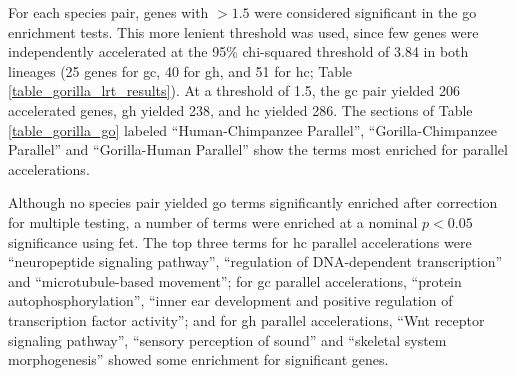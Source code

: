 For each species pair, genes with \lrtmin$>1.5$ were considered
significant in the \ac{go} enrichment tests. This more lenient
threshold was used, since few genes were independently accelerated at
the 95\% chi-squared threshold of 3.84 in both lineages (25 genes for
\ac{gc}, 40 for \ac{gh}, and 51 for \ac{hc}; Table
\ref{table_gorilla_lrt_results}). At a \lrtmin threshold of 1.5, the
\ac{gc} pair yielded 206 accelerated genes, \ac{gh} yielded 238, and
\ac{hc} yielded 286. The sections of Table \ref{table_gorilla_go}
labeled ``Human-Chimpanzee Parallel'', ``Gorilla-Chimpanzee Parallel''
and ``Gorilla-Human Parallel'' show the terms most enriched for
parallel accelerations.

Although no species pair yielded \ac{go} terms significantly enriched
after correction for multiple testing, a number of terms were enriched
at a nominal $p<0.05$ significance using \ac{fet}. The top three terms
for \ac{hc} parallel accelerations were ``neuropeptide signaling
pathway'', ``regulation of DNA-dependent transcription'' and
``microtubule-based movement''; for \ac{gc} parallel accelerations,
``protein autophosphorylation'', ``inner ear development and positive
regulation of transcription factor activity''; and for \ac{gh}
parallel accelerations, ``Wnt receptor signaling pathway'', ``sensory
perception of sound'' and ``skeletal system morphogenesis'' showed
some enrichment for significant genes.

